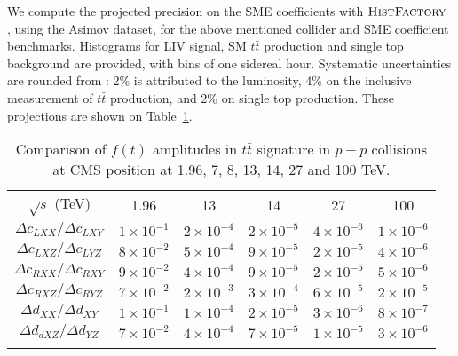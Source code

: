 \documentclass[a4paper,11pt,twoside,french]{article}
\begin{document}
We compute the projected precision on the SME coefficients with $\mbox{\textsc{HistFactory}}$ \cite{Cranmer:2012sba}, using the Asimov dataset, for the above mentioned collider and SME coefficient benchmarks. Histograms for LIV signal, SM $t\bar{t}$ production and single top background are provided, with bins of one sidereal hour. Systematic uncertainties are rounded from \cite{Khachatryan:2016kzg}: 2\% is attributed to the luminosity, 4\% on the inclusive measurement of $t\bar{t}$ production, and 2\% on single top production. These projections are shown on Table~\ref{tab:1}.
\begin{table}[h!]
	\caption{Comparison of $f(t)$ amplitudes in $t\bar{t}$ signature in $p - p$ collisions at CMS position at 1.96, 7, 8, 13, 14, 27 and 100 TeV.}
	\label{tab:1}       %
	\begin{tabular}{cccccc}
		\hline\noalign{\smallskip}
		$\sqrt{s}$ (TeV) &  1.96  & 13  & 14  & 27 & 100\\
		\noalign{\smallskip}\hline\noalign{\smallskip}
		$\Delta c_{LXX} / \Delta c_{LXY}$ & $1\times 10^{-1}$  & $2\times 10^{-4}$ & $2\times 10^{-5}$ & $4\times 10^{-6}$ & $1\times 10^{-6}$ \\
		$\Delta c_{LXZ} / \Delta c_{LYZ}$ & $8\times 10^{-2}$ & $5\times 10^{-4}$ & $9\times 10^{-5}$ & $2\times 10^{-5}$ & $4\times 10^{-6}$ \\
		\noalign{\smallskip}\hline\noalign{\smallskip}
		$\Delta c_{RXX} / \Delta c_{RXY}$ & $9\times 10^{-2}$  & $4\times 10^{-4}$ & $9\times 10^{-5}$ & $2\times 10^{-5}$ & $5\times 10^{-6}$ \\
		$\Delta c_{RXZ} / \Delta c_{RYZ}$ & $7\times 10^{-2}$ & $2\times 10^{-3}$ & $3\times 10^{-4}$ & $6\times 10^{-5}$ & $2\times 10^{-5}$ \\
		\noalign{\smallskip}\hline\noalign{\smallskip}
		$\Delta d_{XX} / \Delta d_{XY}$ & $1\times 10^{-1}$  & $1\times 10^{-4}$ & $2\times 10^{-5}$ & $3\times 10^{-6}$ & $8\times 10^{-7}$ \\
		$\Delta d_{dXZ} / \Delta d_{YZ}$ & $7\times 10^{-2}$ & $4\times 10^{-4}$ & $7\times 10^{-5}$ & $1\times 10^{-5}$ & $3\times 10^{-6}$ \\
		\noalign{\smallskip}\hline
	\end{tabular}
\end{table}
\end{document}
